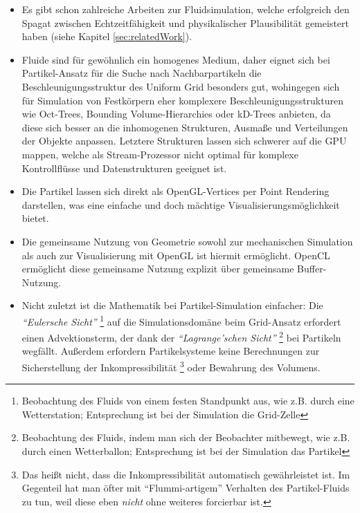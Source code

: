 	\begin{itemize}
 	\item Es gibt schon zahlreiche Arbeiten zur Fluidsimulation, welche erfolgreich den Spagat zwischen Echtzeitfähigkeit 
 	und physikalischer Plausibilität gemeistert haben (siehe Kapitel \ref{sec:relatedWork}).
 	\item Fluide sind für gewöhnlich ein homogenes Medium, daher eignet sich bei Partikel-Ansatz für die Suche nach 
 	Nachbarpartikeln die \linebreak Beschleunigungsstruktur des Uniform Grid besonders gut, wohingegen sich für Simulation 
 	von Festkörpern eher komplexere Beschleunigungsstrukturen wie Oct-Trees, Bounding Volume-Hierarchies oder kD-Trees 
 	anbieten, da diese sich besser an die inhomogenen Strukturen, Ausmaße und Verteilungen der Objekte anpassen.	
 	Letztere Strukturen lassen sich schwerer auf die GPU mappen, welche als Stream-Prozessor nicht optimal für komplexe 
	Kontrollflüsse und Datenstrukturen geeignet ist.
	\item Die Partikel lassen sich direkt als OpenGL-Vertices per Point Rendering darstellen, was eine einfache und doch 
	mächtige Visualisierungsmöglichkeit bietet.
	\item Die gemeinsame Nutzung von Geometrie sowohl zur mechanischen Simulation als auch zur Visualisierung mit OpenGL
	ist hiermit ermöglicht. OpenCL ermöglicht diese gemeinsame Nutzung explizit über gemeinsame Buffer-Nutzung.
	\item Nicht zuletzt ist die Mathematik bei Partikel-Simulation einfacher: 
	Die \emph{"`Eulersche Sicht"'}
	\footnote{Beobachtung des Fluids von einem festen Standpunkt aus, wie z.B. durch eine Wetterstation;
	 	Entsprechung ist bei der Simulation die Grid-Zelle}	 
	auf die Simulationsdomäne beim Grid-Ansatz erfordert einen Advektionsterm, 
	der dank der \emph{"`Lagrange'schen Sicht"'} 
	\footnote{Beobachtung des Fluids, indem man sich der Beobachter mitbewegt, wie z.B. durch einen Wetterballon;
		Entsprechung ist bei der Simulation das Partikel}	
	bei Partikeln wegfällt. Außerdem erfordern Partikelsysteme keine Berechnungen zur Sicherstellung der
	Inkompressibilität
	\footnote{
		Das heißt nicht, dass die Inkompressibilität automatisch gewährleistet ist. Im Gegenteil 
		hat man öfter mit "`Flummi-artigem"' Verhalten des Partikel-Fluids zu tun, weil diese eben \emph{nicht} ohne 
		weiteres forcierbar ist.
	} 
	oder Bewahrung des Volumens.

	\end{itemize}


\clearpage
